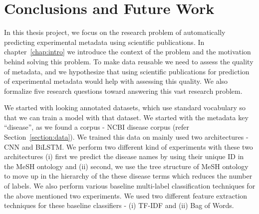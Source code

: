 \chapter{Conclusions and Future Work}\label{conclusion chapter}


In this thesis project, we focus on the research problem of automatically predicting experimental metadata using scientific publications. In chapter~\ref{chap:intro} we introduce the context of the problem and the motivation behind solving this problem. To make data reusable we need to assess the quality of metadata, and we hypothesize that using scientific publications for prediction of experimental metadata would help with assessing this quality. We also formalize five research questions toward answering this vast research problem. 

We started with looking annotated datasets, which use standard vocabulary so that we can train a model with that dataset. We started with the metadata key ``disease'', as we found a corpus - NCBI disease corpus (refer Section~\ref{section:data}). We trained this data on mainly used two architectures - CNN and BiLSTM. We perform two different kind of experiments with these two architectures (i) first we predict the disease names by using their unique ID in the MeSH ontology and (ii) second, we use the tree structure of MeSH ontology to move up in the hierarchy of the these disease terms which reduces the number of labels. We also perform various baseline multi-label classification techniques for the above mentioned two experiments. We used two different feature extraction techniques for these baseline classifiers - (i) TF-IDF and  (ii) Bag of Words. 

